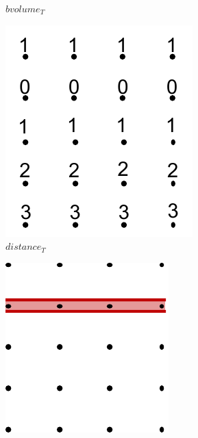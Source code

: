\begin{figure}[!t]
\begin{subfigure}{0.18\linewidth}
\caption{$bvolume_{T}$}
\label{}
\end{subfigure}
\hspace{2mm}
\begin{subfigure}{0.18\linewidth}
\includegraphics[width=\linewidth]{Images/distanceT.pdf}
\caption{$distance_{T}$}
\label{}
\end{subfigure}
\hspace{2mm}
\begin{subfigure}{0.18\linewidth}
\includegraphics[width=\linewidth]{Images/zlsT.pdf}

\end{subfigure}
\end{figure}
